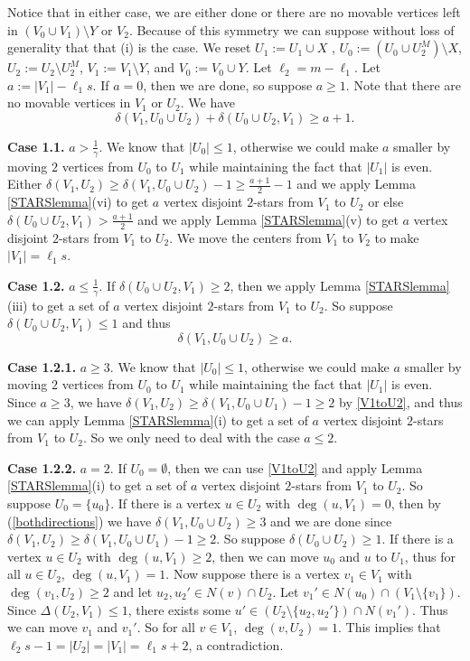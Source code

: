 \documentclass[oneside,12pt]{memoir}
\begin{document}
Notice that in either case, we are either done or there are no movable vertices left in $(V_0\cup V_1)\setminus Y$ or $V_2$.  Because of this symmetry we can suppose without loss of generality that that (i) is the case.  We reset $U_1:=U_1\cup X$ , $U_0:=(U_0\cup U_2^M)\setminus X$, $U_2:=U_2\setminus U_2^M$, $V_1:=V_1\setminus Y$, and $V_0:=V_0\cup Y$.  Let $\ell_2=m-\ell_1$.  Let $a:=|V_1|-\ell_1s$.  If $a=0$, then we are done, so suppose $a\geq 1$.  Note that there are no movable vertices in $V_1$ or $U_2$.  We have \begin{equation}\label{bothdirections}\delta(V_1, U_0\cup U_2)+\delta(U_0\cup U_2, V_1)\geq a+1.\end{equation} 

\textbf{Case 1.1.} $a>\frac{1}{\gamma}$.  We know that $|U_0|\leq 1$, otherwise we could make $a$ smaller by moving $2$ vertices from $U_0$ to $U_1$ while maintaining the fact that $|U_1|$ is even.  Either $\delta(V_1, U_2)\geq \delta(V_1, U_0\cup U_2)-1\geq \frac{a+1}{2}-1$ and we apply Lemma \ref{STARSlemma}(vi) to get $a$ vertex disjoint $2$-stars from $V_1$ to $U_2$ or else $\delta(U_0\cup U_2, V_1)> \frac{a+1}{2}$ and we apply Lemma \ref{STARSlemma}(v) to get $a$ vertex disjoint $2$-stars from $V_1$ to $U_2$.  We move the centers from $V_1$ to $V_2$ to make $|V_1|=\ell_1 s$.

\textbf{Case 1.2.} $a\leq \frac{1}{\gamma}$. If $\delta(U_0\cup U_2, V_1)\geq 2$, then we apply Lemma \ref{STARSlemma}(iii) to get a set of $a$ vertex disjoint $2$-stars from $V_1$ to $U_2$. So suppose $\delta(U_0\cup U_2, V_1)\leq 1$ and thus \begin{equation}\label{V1toU2}\delta(V_1, U_0\cup U_2)\geq a.\end{equation}

\textbf{Case 1.2.1.} $a\geq 3$.  We know that $|U_0|\leq 1$, otherwise we could make $a$ smaller by moving $2$ vertices from $U_0$ to $U_1$ while maintaining the fact that $|U_1|$ is even.  Since $a\geq 3$, we have $\delta(V_1, U_2)\geq \delta(V_1, U_0\cup U_1)-1\geq 2$ by \eqref{V1toU2}, and thus we can apply Lemma \ref{STARSlemma}(i) to get a set of $a$ vertex disjoint $2$-stars from $V_1$ to $U_2$.
So we only need to deal with the case $a\leq 2$.  

\textbf{Case 1.2.2.} $a=2$.  If $U_0=\emptyset$, then we can use \eqref{V1toU2} and apply Lemma \ref{STARSlemma}(i) to get a set of $a$ vertex disjoint $2$-stars from $V_1$ to $U_2$.  So suppose $U_0=\{u_0\}$.  If there is a vertex $u\in U_2$ with $\deg(u, V_1)=0$, then by (\ref{bothdirections}) we have $\delta(V_1, U_0\cup U_2)\geq 3$ and we are done since $\delta(V_1, U_2)\geq \delta(V_1, U_0\cup U_1)-1\geq 2$. So suppose $\delta(U_0\cup U_2)\geq 1$.  If there is a vertex $u\in U_2$ with $\deg(u, V_1)\geq 2$, then we can move $u_0$ and $u$ to $U_1$, thus for all $u\in U_2$, $\deg(u, V_1)=1$.  Now suppose there is a vertex $v_1\in V_1$ with $\deg(v_1, U_2)\geq 2$ and let $u_2, u_2'\in N(v)\cap U_2$.  Let $v_1'\in N(u_0)\cap (V_1\setminus \{v_1\})$.  Since $\Delta(U_2, V_1)\leq 1$, there exists some $u'\in (U_2\setminus \{u_2, u_2'\})\cap N(v_1')$.  Thus we can move $v_1$ and $v_1'$.  So for all $v\in V_1$, $\deg(v, U_2)=1$.  This implies that $\ell_2s-1=|U_2|=|V_1|=\ell_1s+2$, a contradiction.
\end{document}
